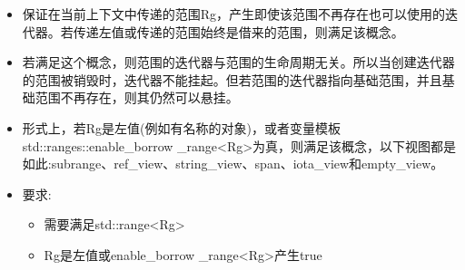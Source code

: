 
\begin{itemize}
\item
保证在当前上下文中传递的范围Rg，产生即使该范围不再存在也可以使用的迭代器。若传递左值或传递的范围始终是借来的范围，则满足该概念。

\item
若满足这个概念，则范围的迭代器与范围的生命周期无关。所以当创建迭代器的范围被销毁时，迭代器不能挂起。但若范围的迭代器指向基础范围，并且基础范围不再存在，则其仍然可以悬挂。

\item
形式上，若Rg是左值(例如有名称的对象)，或者变量模板std::ranges::enable\_borrow \_range<Rg>为真，则满足该概念，以下视图都是如此:subrange、ref\_view、string\_view、span、iota\_view和empty\_view。

\item
要求:

\begin{itemize}
\item
需要满足std::range<Rg>

\item
Rg是左值或enable\_borrow \_range<Rg>产生true
\end{itemize}
\end{itemize}


